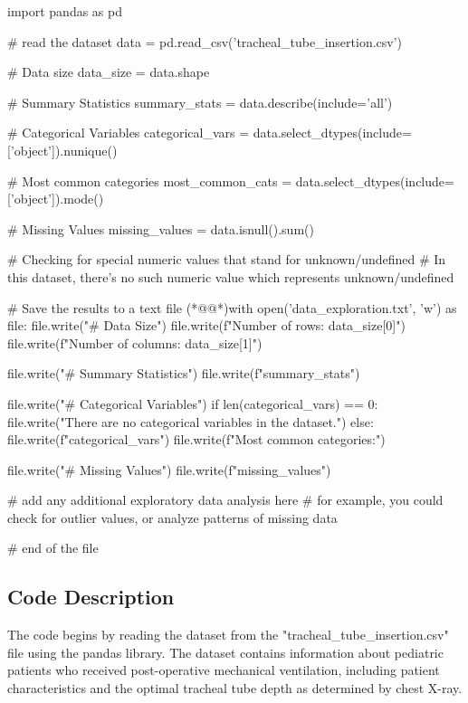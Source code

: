 \documentclass[11pt]{article}
\begin{document}
\begin{python}

import pandas as pd

# read the dataset
data = pd.read_csv('tracheal_tube_insertion.csv')

# Data size
data_size = data.shape

# Summary Statistics
summary_stats = data.describe(include='all')

# Categorical Variables
categorical_vars = data.select_dtypes(include=['object']).nunique()

# Most common categories
most_common_cats = data.select_dtypes(include=['object']).mode()

# Missing Values
missing_values = data.isnull().sum()

# Checking for special numeric values that stand for unknown/undefined
# In this dataset, there's no such numeric value which represents unknown/undefined

# Save the results to a text file
(*@@*)with open('data_exploration.txt', 'w') as file:
    file.write("# Data Size\n")
    file.write(f"Number of rows: {data_size[0]}\n")
    file.write(f"Number of columns: {data_size[1]}\n\n")
    
    file.write("# Summary Statistics\n")
    file.write(f"{summary_stats}\n\n")
    
    file.write("# Categorical Variables\n")
    if len(categorical_vars) == 0:
        file.write("There are no categorical variables in the dataset.")
    else:
        file.write(f"{categorical_vars}\n")
        file.write(f"Most common categories:\n")
        
    file.write("\n# Missing Values\n")
    file.write(f"{missing_values}\n\n")

    # add any additional exploratory data analysis here
    # for example, you could check for outlier values, or analyze patterns of missing data

    # end of the file

\end{python}

\subsection{Code Description}

The code begins by reading the dataset from the "tracheal\_tube\_insertion.csv" file using the pandas library. The dataset contains information about pediatric patients who received post-operative mechanical ventilation, including patient characteristics and the optimal tracheal tube depth as determined by chest X-ray.
\end{document}
